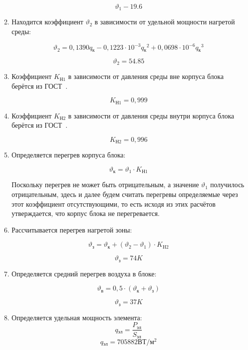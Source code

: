 \begin{enumerate}
$$\vartheta_1 -19.6$$
\item Находится коэффициент $\vartheta_2$ в зависимости от удельной мощности нагретой среды:

\begin{equation}
\vartheta_2 = 0,1390q\mathrm{_к} - 0,1223 \cdot 10^{-3}q\mathrm{_к}^2 + 0,0698 \cdot 10^{-6}q\mathrm{_к}^3
\end{equation}

$$\vartheta_2 = 54.85$$

\item Коэффициент $K\mathrm{_{Н1}}$ в зависимости от давления
  среды вне корпуса блока берётся из ГОСТ~\cite{GOST-15150-69}.

  $$K\mathrm{_{Н1}} = 0,999$$

  \item Коэффициент $K\mathrm{_{Н2}}$ в зависимости от давления
  среды внутри корпуса блока берётся из ГОСТ~\cite{GOST-15150-69}.

  $$K\mathrm{_{Н2}} = 0,996$$

\item Определяется перегрев корпуса блока:

  \begin{equation}
    \vartheta\mathrm{_к} = \vartheta_1 \cdot K\mathrm{_{Н1}}
  \end{equation}

  Поскольку перегрев не может быть отрицательным, а значение
$\vartheta_1$ получилось отрицательным, здесь и далее будем считать
перегревы определяемые через этот коэффициент отсутствующими, то есть
исходя из этих расчётов утверждается, что корпус блока не
перегревается.

\item Рассчитывается перегрев нагретой зоны:

  \begin{equation}
    \vartheta\mathrm{_з} = \vartheta\mathrm{_к} + (\vartheta_2 - \vartheta_1) \cdot K\mathrm{_{H2}}
  \end{equation}

    $$\vartheta\mathrm{_з} = 74K$$

\item Определяется средний перегрев воздуха в блоке:

  \begin{equation}
      \vartheta\mathrm{_в} = 0,5 \cdot (\vartheta\mathrm{_к} + \vartheta\mathrm{_з})
    \end{equation}
    
    $$\vartheta\mathrm{_з} = 37K$$
\item Определяется удельная мощность элемента:
    \begin{equation}
      q\mathrm{_{эл}} = \frac{P\mathrm{_{эл}}}{S\mathrm{_{эл}}}
    \end{equation}
    $$q\mathrm{_{эл}} = 705882\mathrm{ВТ/м^2} $$
\end{enumerate}
  
